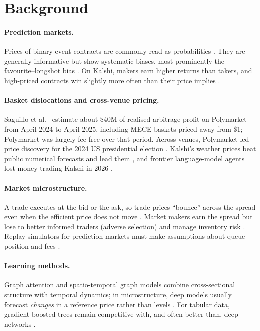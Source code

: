 \documentclass[11pt,a4paper]{article}
\begin{document}
\section{Background}

\paragraph{Prediction markets.} Prices of binary event contracts are commonly read as probabilities
\cite{wolfers2004}. They are generally informative but show systematic biases, most prominently the
favourite--longshot bias \cite{snowberg2010}. On Kalshi, makers earn higher returns than takers, and high-priced
contracts win slightly more often than their price implies \cite{burgi2025}.

\paragraph{Basket dislocations and cross-venue pricing.} Saguillo et al.\ \cite{saguillo2025} estimate about \$40M
of realised arbitrage profit on Polymarket from April 2024 to April 2025, including MECE baskets priced away from
\$1; Polymarket was largely fee-free over that period. Across venues, Polymarket led price discovery for the 2024 US
presidential election \cite{aktug2026}. Kalshi's weather prices beat public numerical forecasts and lead them
\cite{crosier2026}, and frontier language-model agents lost money trading Kalshi in 2026 \cite{predictionarena2026}.

\paragraph{Market microstructure.} A trade executes at the bid or the ask, so trade prices ``bounce'' across the
spread even when the efficient price does not move \cite{roll1984}. Market makers earn the spread but lose to better
informed traders (adverse selection) \cite{glosten1985} and manage inventory risk \cite{avellaneda2008}. Replay
simulators for prediction markets must make assumptions about queue position and fees \cite{arora2026}.

\paragraph{Learning methods.} Graph attention \cite{velickovic2018} and spatio-temporal graph models
\cite{yu2018stgcn} combine cross-sectional structure with temporal dynamics; in microstructure, deep models usually
forecast \emph{changes} in a reference price rather than levels \cite{zhang2019deeplob}. For tabular data,
gradient-boosted trees \cite{ke2017lightgbm} remain competitive with, and often better than, deep networks
\cite{grinsztajn2022}.
\end{document}

